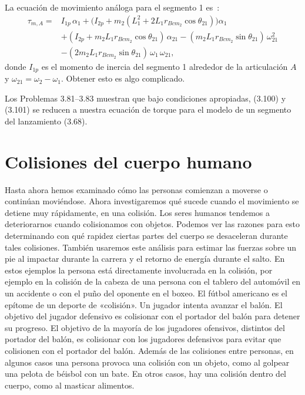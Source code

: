 \documentclass[12pt]{book}
\begin{document}
La ecuación de movimiento análoga para el segmento 1 es~\cite{ref42,ref43,ref120}:
\begin{equation}
\begin{split}
\tau_{m,A} = {} & I_{1p}\,\alpha_1 + \bigl(I_{2p} + m_2(L_1^2 + 2L_1 r_{Bcm_2}\cos\theta_{21})\bigr)\alpha_1 \\
& + (I_{2p} + m_2 L_1 r_{Bcm_2}\cos\theta_{21})\,\alpha_{21} - (m_2 L_1 r_{Bcm_2}\sin\theta_{21})\,\omega_{21}^2 \\
& - (2m_2 L_1 r_{Bcm_2}\sin\theta_{21})\,\omega_1\,\omega_{21},
\end{split}
\label{eq:3.101}
\end{equation}
donde $I_{1p}$ es el momento de inercia del segmento 1 alrededor de la articulación $A$ y $\omega_{21} = \omega_2 - \omega_1$. Obtener esto es algo complicado.

Los Problemas 3.81--3.83 muestran que bajo condiciones apropiadas, (3.100) y (3.101) se reducen a nuestra ecuación de torque para el modelo de un segmento del lanzamiento (3.68).

\section{Colisiones del cuerpo humano}

Hasta ahora hemos examinado cómo las personas comienzan a moverse o continúan moviéndose. Ahora investigaremos qué sucede cuando el movimiento se detiene muy rápidamente, en una colisión. Los seres humanos tendemos a deteriorarnos cuando colisionamos con objetos. Podemos ver las razones para esto determinando con qué rapidez ciertas partes del cuerpo se desaceleran durante tales colisiones. También usaremos este análisis para estimar las fuerzas sobre un pie al impactar durante la carrera y el retorno de energía durante el salto. En estos ejemplos la persona está directamente involucrada en la colisión, por ejemplo en la colisión de la cabeza de una persona con el tablero del automóvil en un accidente o con el puño del oponente en el boxeo. El fútbol americano es el epítome de un deporte de «colisión». Un jugador intenta avanzar el balón. El objetivo del jugador defensivo es colisionar con el portador del balón para detener su progreso. El objetivo de la mayoría de los jugadores ofensivos, distintos del portador del balón, es colisionar con los jugadores defensivos para evitar que colisionen con el portador del balón. Además de las colisiones entre personas, en algunos casos una persona provoca una colisión con un objeto, como al golpear una pelota de béisbol con un bate. En otros casos, hay una colisión dentro del cuerpo, como al masticar alimentos.
\end{document}
